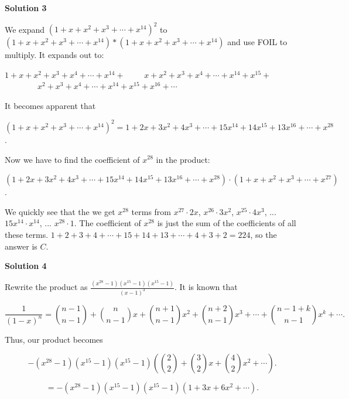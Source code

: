 \begin{enumerate}
 



\textbf{Solution 3}

We expand $(1 + x + x^2 + x^3 + \cdots + x^{14})^2$ to $(1 + x + x^2 + x^3 + \cdots + x^{14}) * (1 + x + x^2 + x^3 + \cdots + x^{14})$ and use FOIL to multiply. It expands out to:

 $1 + x + x^2 + x^3 + x^4 + \cdots + x^{14} +$
$\qquad x + x^2 + x^3 + x^4 + \cdots + x^{14} + x^{15} +$
$\qquad \qquad x^2 + x^3 + x^4 + \cdots + x^{14} + x^{15} + x^{16} + \cdots$

 It becomes apparent that 

 $(1 + x + x^2 + x^3 + \cdots + x^{14})^2 = 1 + 2x + 3x^2 + 4x^3 + \cdots + 15x^{14} + 14x^{15} + 13x^{16} + \cdots + x^{28}$.

 Now we have to find the coefficient of $x^{28}$ in the product: 

 $(1 + 2x + 3x^2 + 4x^3 + \cdots + 15x^{14} + 14x^{15} + 13x^{16} + \cdots + x^{28}) \cdot (1 + x + x^2 + x^3 + \cdots + x^{27})$.

 We quickly see that the we get $x^{28}$ terms from $x^{27} \cdot 2x$, $x^{26} \cdot 3x^2$, $x^{25} \cdot 4x^3$, ... $15x^{14} \cdot x^{14}$, ... $x^{28} \cdot 1$. The coefficient of $x^{28}$ is just the sum of the coefficients of all these terms. $1 + 2 + 3 + 4 + \cdots + 15 + 14 + 13 + \cdots + 4 + 3 + 2 = 224$, so the answer is $\boxed{C}$.

 



\textbf{Solution 4}

Rewrite the product as $\frac{(x^{28} - 1)(x^{15} - 1)(x^{15} - 1)}{(x - 1)^3}$. It is known that 

 
 \[\frac{1}{(1 - x)^n} = \binom{n - 1}{n - 1} + \binom{n}{n - 1}x + \binom{n + 1}{n - 1}x^2 + \binom{n + 2}{n - 1}x^3 + \cdots + \binom{n - 1 + k}{n - 1}x^k + \cdots .\]

 Thus, our product becomes

 
 \[-\left( x^{28} - 1 \right) \left( x^{15} - 1 \right) \left( x^{15} - 1 \right) \left( \binom{2}{2} + \binom{3}{2}x + \binom{4}{2}x^2 + \cdots \right).\]

 \[= -\left( x^{28} - 1 \right) \left( x^{15} - 1 \right) \left( x^{15} - 1 \right) \left( 1 + 3x + 6x^2 + \cdots \right).\]


\end{enumerate}
